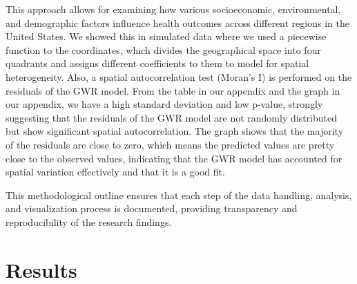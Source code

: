 \documentclass[
]{article}
\begin{document}
This approach allows for examining how various socioeconomic,
environmental, and demographic factors influence health outcomes across
different regions in the United States. We showed this in simulated data
where we used a piecewise function to the coordinates, which divides the
geographical space into four quadrants and assigns different
coefficients to them to model for spatial heterogeneity. Also, a spatial
autocorrelation test (Moran's I) is performed on the residuals of the
GWR model. From the table in our appendix and the graph in our appendix,
we have a high standard deviation and low p-value, strongly suggesting
that the residuals of the GWR model are not randomly distributed but
show significant spatial autocorrelation. The graph shows that the
majority of the residuals are close to zero, which means the predicted
values are pretty close to the observed values, indicating that the GWR
model has accounted for spatial variation effectively and that it is a
good fit.

This methodological outline ensures that each step of the data handling,
analysis, and visualization process is documented, providing
transparency and reproducibility of the research findings.

\begin{figure}[!ht]


\caption{\label{fig-1}}

\end{figure}%

\section{Results}\label{results}
\end{document}

